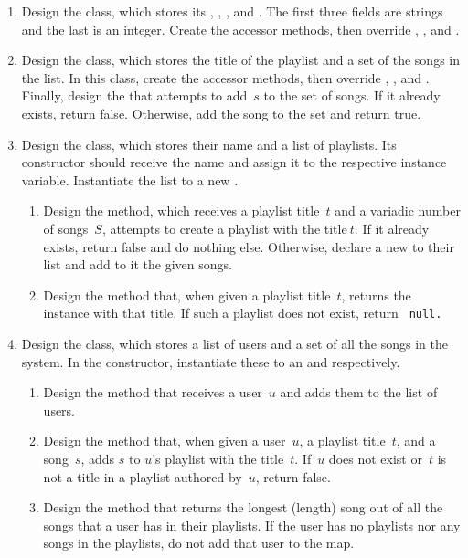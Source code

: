 \begin{enumerate}[label=(\alph*)]
  \item Design the  class, which stores its , , , and . The first three fields are strings and the last is an integer. Create the accessor methods, then override , , and .
  \item Design the  class, which stores the title of the playlist and a set of the songs in the list. In this class, create the accessor methods, then override , , and . Finally, design the  that attempts to add~$s$ to the set of songs. If it already exists, return false. Otherwise, add the song to the set and return true.
  \item Design the  class, which stores their name and a list of playlists. Its constructor should receive the name and assign it to the respective instance variable. Instantiate the list to a new . 
  \begin{enumerate}[label=(\roman*)]
    \item Design the  method, which receives a playlist title~$t$ and a variadic number of songs~$S$, attempts to create a playlist with the title$~t$. If it already exists, return false and do nothing else. Otherwise, declare a new  to their list and add to it the given songs.
    \item Design the  method that, when given a playlist title~$t$, returns the  instance with that title. If such a playlist does not exist, return \tt~{null}.
  \end{enumerate}
  \item Design the  class, which stores a list of users and a set of all the songs in the system. In the constructor, instantiate these to an  and  respectively.
  \begin{enumerate}[label=(\roman*)]
    \item Design the  method that receives a user~$u$ and adds them to the list of users.
    \item Design the  method that, when given a user~$u$, a playlist title~$t$, and a song~$s$, adds $s$ to $u$'s playlist with the title~$t$. If~$u$ does not exist or~$t$ is not a title in a playlist authored by~$u$, return false.
    \item Design the  method that returns the longest (length) song out of all the songs that a user has in their playlists. If the user has no playlists nor any songs in the playlists, do not add that user to the map.
  \end{enumerate}
\end{enumerate}

